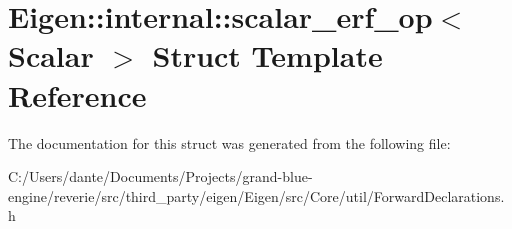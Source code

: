 \hypertarget{struct_eigen_1_1internal_1_1scalar__erf__op}{}\section{Eigen\+::internal\+::scalar\+\_\+erf\+\_\+op$<$ Scalar $>$ Struct Template Reference}
\label{struct_eigen_1_1internal_1_1scalar__erf__op}


The documentation for this struct was generated from the following file\+:\begin{DoxyCompactItemize}
\item 
C\+:/\+Users/dante/\+Documents/\+Projects/grand-\/blue-\/engine/reverie/src/third\+\_\+party/eigen/\+Eigen/src/\+Core/util/Forward\+Declarations.\+h\end{DoxyCompactItemize}
